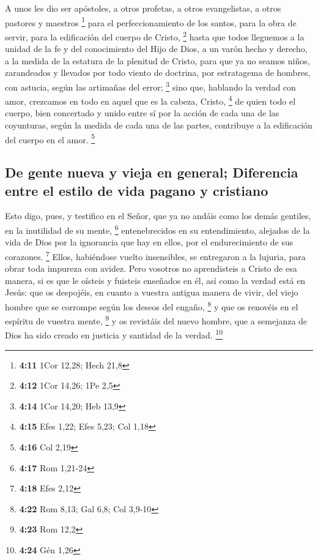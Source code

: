 \begin{paracol}{2}
 A unos les dio ser apóstoles, a otros profetas, a otros
evangelistas, a otros pastores y maestros \footnote{\textbf{4:11} 1Cor
  12,28; Hech 21,8}  para el perfeccionamiento de los
santos, para la obra de servir, para la edificación del cuerpo de
Cristo, \footnote{\textbf{4:12} 1Cor 14,26; 1Pe 2,5} 
hasta que todos lleguemos a la unidad de la fe y del conocimiento del
Hijo de Dios, a un varón hecho y derecho, a la medida de la estatura de
la plenitud de Cristo,  para que ya no seamos niños,
zarandeados y llevados por todo viento de doctrina, por estratagema de
hombres, con astucia, según las artimañas del error; \footnote{\textbf{4:14}
  1Cor 14,20; Heb 13,9}  sino que, hablando la verdad con
amor, crezcamos en todo en aquel que es la cabeza, Cristo, \footnote{\textbf{4:15}
  Efes 1,22; Efes 5,23; Col 1,18}  de quien todo el
cuerpo, bien concertado y unido entre sí por la acción de cada una de
las coyunturas, según la medida de cada una de las partes, contribuye a
la edificación del cuerpo en el amor. \footnote{\textbf{4:16} Col 2,19}

\hypertarget{de-gente-nueva-y-vieja-en-general-diferencia-entre-el-estilo-de-vida-pagano-y-cristiano}{%
\subsection{De gente nueva y vieja en general; Diferencia entre el
estilo de vida pagano y
cristiano}\label{de-gente-nueva-y-vieja-en-general-diferencia-entre-el-estilo-de-vida-pagano-y-cristiano}}

 Esto digo, pues, y testifico en el Señor, que ya no
andáis como los demás gentiles, en la inutilidad de su mente,
\footnote{\textbf{4:17} Rom 1,21-24}  entenebrecidos en
su entendimiento, alejados de la vida de Dios por la ignorancia que hay
en ellos, por el endurecimiento de sus corazones. \footnote{\textbf{4:18}
  Efes 2,12}  Ellos, habiéndose vuelto insensibles, se
entregaron a la lujuria, para obrar toda impureza con avidez.
 Pero vosotros no aprendisteis a Cristo de esa manera,
 si es que le oísteis y fuisteis enseñados en él, así
como la verdad está en Jesús:  que os despojéis, en
cuanto a vuestra antigua manera de vivir, del viejo hombre que se
corrompe según los deseos del engaño, \footnote{\textbf{4:22} Rom 8,13;
  Gal 6,8; Col 3,9-10}  y que os renovéis en el espíritu
de vuestra mente, \footnote{\textbf{4:23} Rom 12,2}  y os
revistáis del nuevo hombre, que a semejanza de Dios ha sido creado en
justicia y santidad de la verdad. \footnote{\textbf{4:24} Gén 1,26}


\end{paracol}
